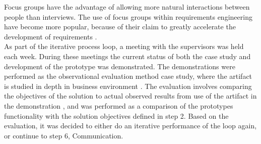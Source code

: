 Focus groups have the advantage of allowing more natural interactions
between people than interviews. The use of focus groups within requirements engineering have become more popular, because of their claim to greatly accelerate the development of requirements \cite{goguen1993techniques}. \\

As part of the iterative process loop, a meeting with the supervisors was held 
each week. During these meetings the current status of both the case study and
development of the prototype was demonstrated. The demonstrations were 
performed as the observational evaluation method case study, where the 
artifact is studied in depth in business environment \cite{von2004design}. The 
evaluation involves comparing the objectives of the solution to actual 
observed results from use of the artifact in the demonstration 
\cite{peffers2006design}, and was performed as a comparison of the prototypes 
functionality with the solution objectives defined in step 2. Based on the 
evaluation, it was decided to either do an iterative performance of the loop 
again, or continue to step 6, Communication.



